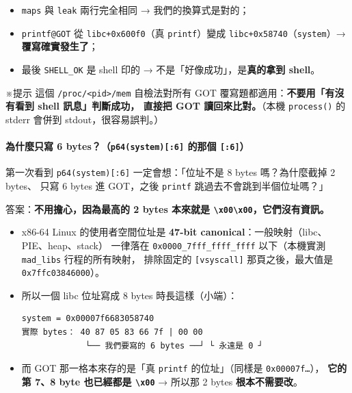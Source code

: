 \documentclass[10pt,a4paper]{article}
\providecommand{\tightlist}{%
  \setlength{\itemsep}{0pt}\setlength{\parskip}{0pt}}
\renewenvironment{quote}{%
  \begin{mdframed}[linewidth=0pt,innerleftmargin=0pt,innerrightmargin=0pt,
    innerbottommargin=0pt,innertopmargin=0pt,skipabove=0.55em,skipbelow=0.55em,
    leftmargin=0.9em,rightmargin=0.4em,startcode={\color{quotebar}\vrule width 2.6pt},%
    endcode={}]%
  \itshape\color{black}%
}{%
  \end{mdframed}%
}
\begin{document}
\begin{itemize}
\tightlist
\item
  \texttt{maps} 與 \texttt{leak} 兩行完全相同 → 我們的換算式是對的；
\item
  \texttt{printf@GOT} 從 \texttt{libc+0x600f0}（真 \texttt{printf}）變成
  \texttt{libc+0x58740}（\texttt{system}）→ \textbf{覆寫確實發生了}；
\item
  最後 \texttt{SHELL\_\allowbreak{}OK} 是 shell 印的 →
  不是「好像成功」，是\textbf{真的拿到 shell}。
\end{itemize}

\begin{quote}
※提示 這個 \texttt{/\allowbreak{}proc/\allowbreak{}\textless{}\allowbreak{}pid\textgreater{}\allowbreak{}/\allowbreak{}mem} 自檢法對所有
GOT 覆寫題都適用：\textbf{不要用「有沒有看到 shell 訊息」判斷成功，
直接把 GOT 讀回來比對。}（本機 \texttt{process()} 的 stderr 會併到
stdout，很容易誤判。）
\end{quote}

\paragraph{\texorpdfstring{為什麼只寫 6
bytes？（\texttt{p64(system){[}:\allowbreak{}6{]}} 的那個
\texttt{{[}:\allowbreak{}6{]}}）}{為什麼只寫 6 bytes？（p64(system){[}:6{]} 的那個 {[}:6{]}）}}\label{ux70baux4ec0ux9ebcux53eaux5beb-6-bytesp64system6-ux7684ux90a3ux500b-6}

第一次看到 \texttt{p64(system){[}:\allowbreak{}6{]}} 一定會想：「位址不是 8 bytes
嗎？為什麼截掉 2 bytes、 只寫 6 bytes 進 GOT，之後 \texttt{printf}
跳過去不會跳到半個位址嗎？」

答案：\textbf{不用擔心，因為最高的 2 bytes 本來就是
\texttt{\textbackslash{}\allowbreak{}x00\textbackslash{}\allowbreak{}x00}，它們沒有資訊。}

\begin{itemize}
\item
  x86-64 Linux 的使用者空間位址是 \textbf{47-bit
  canonical}：一般映射（libc、PIE、heap、stack） 一律落在
  \texttt{0x0000\_\allowbreak{}7fff\_\allowbreak{}ffff\_\allowbreak{}ffff} 以下（本機實測 \texttt{mad\_\allowbreak{}libs}
  行程的所有映射， 排除固定的 \texttt{{[}vsyscall{]}} 那頁之後，最大值是
  \texttt{0x7ffc03846000}）。
\item
  所以一個 libc 位址寫成 8 bytes 時長這樣（小端）：

\begin{Verbatim}[breaklines=true,breakanywhere=true,breakautoindent=false,fontsize=\fontsize{7.0}{9.5}\selectfont]
system = 0x00007f6683058740
實際 bytes： 40 87 05 83 66 7f | 00 00
             └── 我們要寫的 6 bytes ──┘ └ 永遠是 0 ┘
\end{Verbatim}
\item
  而 GOT 那一格本來存的是「真 \texttt{printf} 的位址」（同樣是
  \texttt{0x00007f…}）， \textbf{它的第 7、8 byte 也已經都是
  \texttt{\textbackslash{}\allowbreak{}x00}} → 所以那 2 bytes \textbf{根本不需要改}。
\end{itemize}
\end{document}
